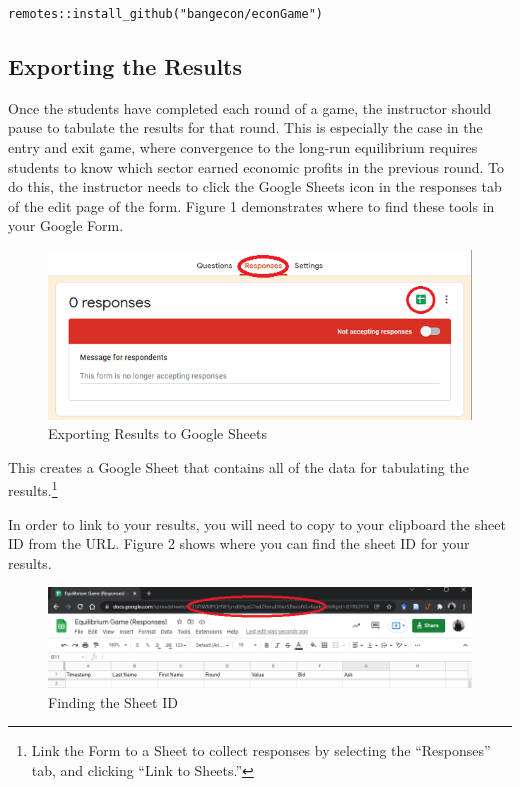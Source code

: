 \documentclass[
]{article}
\begin{document}
\texttt{remotes::install\_github("bangecon/econGame")}

\hypertarget{exporting-the-results}{%
\subsection{Exporting the Results}\label{exporting-the-results}}

Once the students have completed each round of a game, the instructor
should pause to tabulate the results for that round. This is especially
the case in the entry and exit game, where convergence to the long-run
equilibrium requires students to know which sector earned economic
profits in the previous round. To do this, the instructor needs to click
the Google Sheets icon in the responses tab of the edit page of the
form. Figure 1 demonstrates where to find these tools in your Google
Form.

\begin{figure}
\centering
\includegraphics{images/Figure1.png}
\caption{Exporting Results to Google Sheets}
\end{figure}

This creates a Google Sheet that contains all of the data for tabulating
the results.\footnote{Link the Form to a Sheet to collect responses by
  selecting the ``Responses'' tab, and clicking ``Link to Sheets.''}

In order to link to your results, you will need to copy to your
clipboard the sheet ID from the URL. Figure 2 shows where you can find
the sheet ID for your results.

\begin{figure}
\centering
\includegraphics{images/Figure2.png}
\caption{Finding the Sheet ID}
\end{figure}
\end{document}
